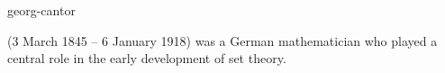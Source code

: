 \documentclass{stex}
\begin{document}
\begin{smodule}{georg-cantor}
\begin{sparagraph}[style=symdoc]
  (3 March 1845 – 6 January 1918) was a German mathematician who played a central role in the early development of set theory.
\end{sparagraph}
\end{smodule}
\end{document}
